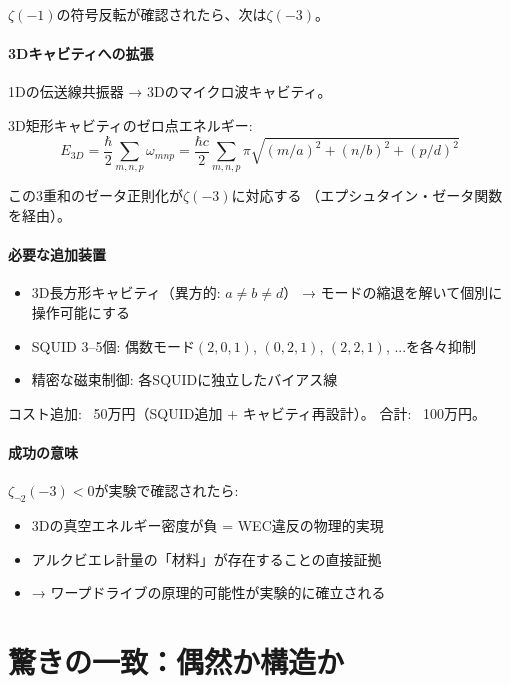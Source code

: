 \documentclass[11pt,a4paper]{article}
\begin{document}
$\zeta(-1)$の符号反転が確認されたら、次は$\zeta(-3)$。

\subsection{3Dキャビティへの拡張}

1Dの伝送線共振器 → 3Dのマイクロ波キャビティ。

3D矩形キャビティのゼロ点エネルギー:
$$E_{3D} = \frac{\hbar}{2}\sum_{m,n,p} \omega_{mnp}
= \frac{\hbar c}{2}\sum_{m,n,p} \pi\sqrt{(m/a)^2 + (n/b)^2 + (p/d)^2}$$

この3重和のゼータ正則化が$\zeta(-3)$に対応する
（エプシュタイン・ゼータ関数を経由）。

\subsection{必要な追加装置}

\begin{itemize}
\item 3D長方形キャビティ（異方的: $a \neq b \neq d$）
  → モードの縮退を解いて個別に操作可能にする
\item SQUID 3--5個: 偶数モード$(2,0,1)$, $(0,2,1)$, $(2,2,1)$, ...を各々抑制
\item 精密な磁束制御: 各SQUIDに独立したバイアス線
\end{itemize}

コスト追加: ~50万円（SQUID追加 + キャビティ再設計）。
合計: ~100万円。

\subsection{成功の意味}

$\zeta_{\neg 2}(-3) < 0$が実験で確認されたら:
\begin{itemize}
\item 3Dの真空エネルギー密度が負 = WEC違反の物理的実現
\item アルクビエレ計量の「材料」が存在することの直接証拠
\item → ワープドライブの原理的可能性が実験的に確立される
\end{itemize}

\part{驚きの一致：偶然か構造か}
\end{document}
